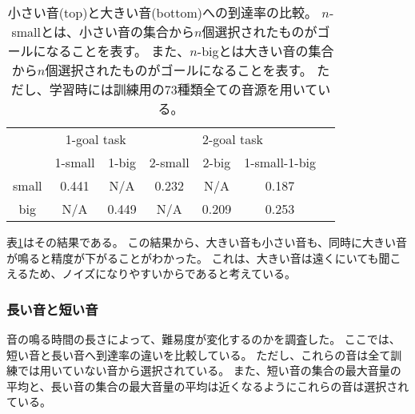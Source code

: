 \begin{table}[tb]
    \caption{
        小さい音(top)と大きい音(bottom)への到達率の比較。
        $n$-smallとは、小さい音の集合から$n$個選択されたものがゴールになることを表す。
        また、$n$-bigとは大きい音の集合から$n$個選択されたものがゴールになることを表す。
        ただし、学習時には訓練用の73種類全ての音源を用いている。
    }
    \label{tab:big_and_small}
    \centering
    \begin{tabular}{@{}ccccccc@{}}
      \toprule
      & \multicolumn{2}{c}{1-goal task} & \multicolumn{3}{c}{2-goal task} \\
      \cmidrule(lr){2-3} \cmidrule(lr){4-6} 
      & 1-small & 1-big & 2-small & 2-big & 1-small-1-big \\
      \midrule
      small & 0.441 & N/A & 0.232 & N/A & 0.187 \\
      big & N/A & 0.449 & N/A & 0.209 & 0.253 \\
      \bottomrule
    \end{tabular}
\end{table}

表\ref{tab:big_and_small}はその結果である。
この結果から、大きい音も小さい音も、同時に大きい音が鳴ると精度が下がることがわかった。
これは、大きい音は遠くにいても聞こえるため、ノイズになりやすいからであると考えている。


\subsubsection{長い音と短い音}

音の鳴る時間の長さによって、難易度が変化するのかを調査した。
ここでは、短い音と長い音へ到達率の違いを比較している。
ただし、これらの音は全て訓練では用いていない音から選択されている。
また、短い音の集合の最大音量の平均と、長い音の集合の最大音量の平均は近くなるようにこれらの音は選択されている。

